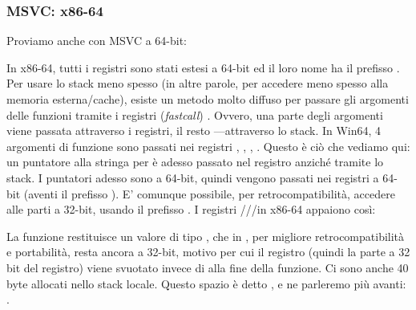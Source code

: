 \subsubsection{MSVC: x86-64}

Proviamo anche con MSVC a 64-bit:




In x86-64, tutti i registri sono stati estesi a 64-bit ed il loro nome ha il prefisso .
Per usare lo stack meno spesso (in altre parole, per accedere meno spesso alla memoria esterna/cache), esiste un metodo molto diffuso per passare gli argomenti delle funzioni tramite i registri (\emph{fastcall}) .
Ovvero, una parte degli argomenti viene passata attraverso i registri, il resto ---attraverso lo stack.
In Win64, 4 argomenti di funzione sono passati nei registri \RCX, \RDX, , .
Questo è ciò che vediamo qui: un puntatore alla stringa per \printf è adesso passato nel registro \RCX anziché tramite lo stack.
I puntatori adesso sono a 64-bit, quindi vengono passati nei registri a 64-bit (aventi il prefisso ).
E' comunque possibile, per retrocompatibilità, accedere alle parti a 32-bit, usando il prefisso .
I registri \RAX/\EAX/\AX/\AL in x86-64 appaiono così:


La funzione \main restituisce un valore di tipo \Tint{}, che in \CCpp, per migliore retrocompatibilità e portabilità, resta ancora a 32-bit, motivo per cui il registro \EAX (quindi la parte a 32 bit del registro) viene svuotato invece di \RAX{} alla fine della funzione.
Ci sono anche 40 byte allocati nello stack locale.
Questo spazio è detto , e ne parleremo più avanti: .

